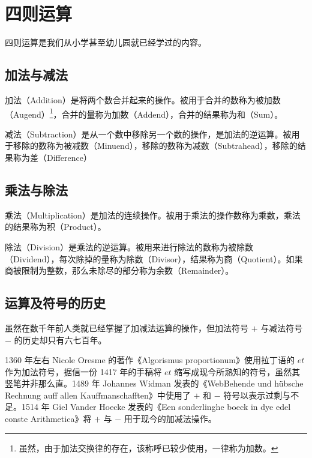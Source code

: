 \section{四则运算}\label{sec:Calculations/ElementaryArithmetic}
    四则运算是我们从小学甚至幼儿园就已经学过的内容。

    \subsection{加法与减法}\label{subsec:Calculations/ElementaryArithmetic/AdditionAndSubtraction}
        加法（Addition）是将两个数合并起来的操作。被用于合并的数称为被加数（Augend）\footnote{虽然，由于加法交换律的存在，该称呼已较少使用，一律称为加数。}，合并的量称为加数（Addend），合并的结果称为和（Sum）。

        减法（Subtraction）是从一个数中移除另一个数的操作，是加法的逆运算。被用于移除的数称为被减数（Minuend），移除的数称为减数（Subtrahead），移除的结果称为差（Difference）

    \subsection{乘法与除法}\label{subsec:Calculations/ElementaryArithmetic/MultiplicationAndDivision}
        乘法（Multiplication）是加法的连续操作。被用于乘法的操作数称为乘数，乘法的结果称为积（Product）。

        除法（Division）是乘法的逆运算。被用来进行除法的数称为被除数（Dividend），每次除掉的量称为除数（Divisor），结果称为商（Quotient）。如果商被限制为整数，那么未除尽的部分称为余数（Remainder）。

    \subsection{运算及符号的历史}\label{subsec:Calculations/ElementaryArithmetic/HistoryOfSymbol}
        虽然在数千年前人类就已经掌握了加减法运算的操作，但加法符号 $+$ 与减法符号 $-$ 的历史却只有六七百年。

        \begin{displayquote}
            1360 年左右 Nicole Oresme 的著作《Algorismus proportionum》使用拉丁语的 $et$ 作为加法符号，据信一份 1417 年的手稿将 $et$ 缩写成现今所熟知的符号，虽然其竖笔并非那么直。1489 年 Johannes Widman 发表的《WebBehende und hübsche Rechnung auff allen Kauffmanschafften》中使用了 $+$ 和 $-$ 符号以表示过剩与不足。1514 年 Giel Vander Hoecke 发表的《Een sonderlinghe boeck in dye edel conste Arithmetica》将 $+$ 与 $-$ 用于现今的加减法操作。
        \end{displayquote}

